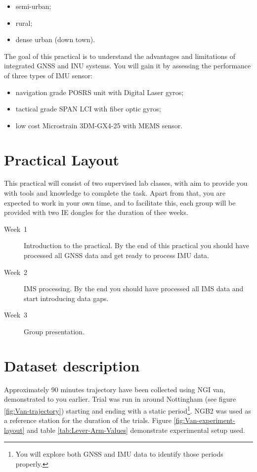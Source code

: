 \documentclass[11pt,fleqn]{book} %
\begin{document}
\begin{itemize}
	\item semi-urban;
	\item rural;
	\item dense urban (down town).
\end{itemize}

The goal of this practical is to understand the advantages and limitations of integrated GNSS and INU systems. You will gain it by assessing the performance of three types of IMU sensor:

\begin{itemize}
	\item navigation grade POSRS unit with Digital Laser gyros;
	\item tactical grade SPAN LCI with fiber optic gyros;
	\item low cost Microstrain 3DM-GX4-25 with MEMS sensor.
\end{itemize}

\newpage
\section{Practical Layout}

This practical will consist of two supervised lab classes, with aim to provide you with tools and knowledge to complete the task. Apart from that, you are expected to work in your own time, and to facilitate this, each group will be provided with two IE dongles for the duration of thee weeks.

\begin{description}
	\item [{Week~1}] Introduction to the practical. By the end of this practical you should
	have processed all GNSS data and get ready to process IMU data.
	\item [{Week~2}] IMS processing. By the end you should have processed
	all IMS data and start introducing data gaps.
	\item [{Week~3}] Group presentation.
\end{description}

\section{Dataset description}

Approximately 90 minutes trajectory have been collected using NGI van, demonstrated to you earlier. Trial was run in around Nottingham (see figure \ref{fig:Van-trajectory}) starting and ending with a static period\footnote{You will explore both GNSS and IMU data to identify those periods properly.}. NGB2 was used as a reference station for the duration of the trials.
Figure \ref{fig:Van-experiment-layout} and table \ref{tab:Lever-Arm-Values} demonstrate experimental setup used.
\end{document}
